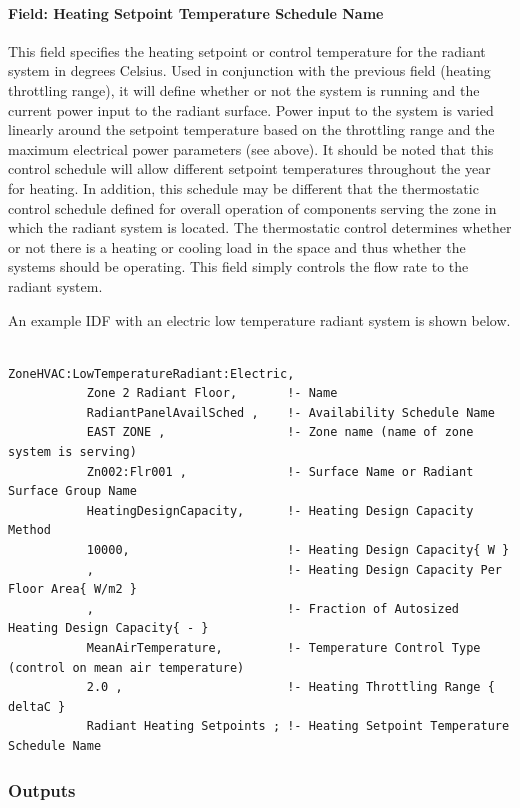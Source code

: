 \paragraph{Field: Heating Setpoint Temperature Schedule Name}\label{field-heating-setpoint-temperature-schedule-name}

This field specifies the heating setpoint or control temperature for the radiant system in degrees Celsius. Used in conjunction with the previous field (heating throttling range), it will define whether or not the system is running and the current power input to the radiant surface. Power input to the system is varied linearly around the setpoint temperature based on the throttling range and the maximum electrical power parameters (see above). It should be noted that this control schedule will allow different setpoint temperatures throughout the year for heating. In addition, this schedule may be different that the thermostatic control schedule defined for overall operation of components serving the zone in which the radiant system is located. The thermostatic control determines whether or not there is a heating or cooling load in the space and thus whether the systems should be operating. This field simply controls the flow rate to the radiant system.

An example IDF with an electric low temperature radiant system is shown below.

\begin{lstlisting}

ZoneHVAC:LowTemperatureRadiant:Electric, 
           Zone 2 Radiant Floor,       !- Name
           RadiantPanelAvailSched ,    !- Availability Schedule Name
           EAST ZONE ,                 !- Zone name (name of zone system is serving)
           Zn002:Flr001 ,              !- Surface Name or Radiant Surface Group Name
           HeatingDesignCapacity,      !- Heating Design Capacity Method
           10000,                      !- Heating Design Capacity{ W }
           ,                           !- Heating Design Capacity Per Floor Area{ W/m2 }
           ,                           !- Fraction of Autosized Heating Design Capacity{ - }
           MeanAirTemperature,         !- Temperature Control Type (control on mean air temperature)
           2.0 ,                       !- Heating Throttling Range { deltaC }
           Radiant Heating Setpoints ; !- Heating Setpoint Temperature Schedule Name
\end{lstlisting}

\subsubsection{Outputs}\label{outputs-7-007}

